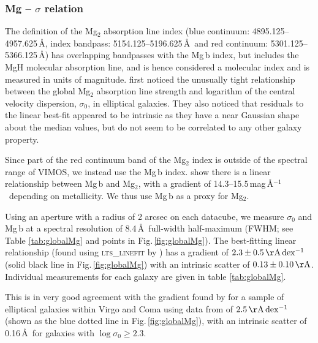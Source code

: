 		\subsubsection{Mg -- $\sigma$ relation}
			\label{subsubssec:Mgsigma}
			The definition of the Mg$_2$ absorption line index (blue continuum: 4895.125--4957.625\,\AA, index bandpass: 5154.125--5196.625\,\AA\ and red continuum: 5301.125--5366.125\,\AA) has overlapping bandpasses with the Mg\,b index, but includes the MgH molecular absorption line, and is hence considered a molecular index and is measured in units of magnitude. \citet{Bender1993} first noticed the unusually tight relationship between the global Mg$_2$ absorption line strength and logarithm of the central velocity dispersion, $\sigma_0$, in elliptical galaxies. They also noticed that residuals to the linear best-fit appeared to be intrinsic as they have a near Gaussian shape about the median values, but do not seem to be correlated to any other galaxy property. 

			Since part of the red continuum band of the Mg$_2$ index is outside of the spectral range of VIMOS, we instead use the Mg\,b index. \citet{Ziegler1997} show there is a linear relationship between Mg\,b and Mg$_2$, with a gradient of 14.3--15.5\,mag\,\AA$^{-1}$\ depending on metallicity. We thus use Mg\,b as a proxy for Mg$_2$. 

			Using an aperture with a radius of 2 arcsec on each datacube, we measure $\sigma_0$ and Mg\,b at a spectral resolution of 8.4\,\AA\ full-width half-maximum (FWHM; see Table \ref{tab:globalMg} and points in Fig.\,\ref{fig:globalMg}). The best-fitting linear relationship (found using \textsc{lts\_linefit} by \citealt{Cappellari2013}) has a gradient of $2.3 \pm 0.5 \,\mathrm{\AA\,dex^{-1}}$ (solid black line in Fig.\,\ref{fig:globalMg}) with an intrinsic scatter of $0.13 \pm 0.10 \, \mathrm{\AA}$. Individual measurements for each galaxy are given in table \ref{tab:globalMg}.

			This is in very good agreement with the gradient found by \citet{Ziegler1997} for a sample of elliptical galaxies within Virgo and Coma using data from \citet{Dressler1987} of $2.5\,\mathrm{\AA\,dex^{-1}}$ (shown as the blue dotted line in Fig.\,\ref{fig:globalMg}), with an intrinsic scatter of 0.16\,\AA\ for galaxies with $\log \sigma_0 \geqslant 2.3$. 

